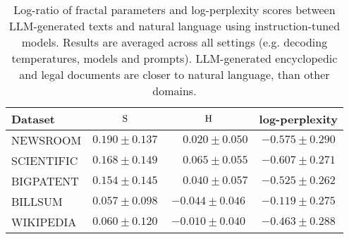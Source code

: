 \begin{table}[t]
    \centering\scriptsize
    \caption{Log-ratio of fractal parameters and log-perplexity scores between LLM-generated texts and natural language using instruction-tuned models. Results are averaged across all settings (e.g. decoding temperatures,  models and prompts). LLM-generated encyclopedic and legal documents are closer to natural language, than other domains.
    }
    \label{tab:domains}
\begin{tabularx}{\linewidth}{l|c|c|c}
  \toprule
  \bf Dataset& $\mathrm{S}$ & $\mathrm{H}$ &\bf log-perplexity \\ \midrule
  NEWSROOM &$0.190\pm0.137$ & $\phantom{+}0.020\pm0.050$& $-0.575\pm0.290$\\
  SCIENTIFIC &$0.168\pm0.149$ &$\phantom{+}0.065\pm0.055$ &$-0.607\pm0.271$ \\
  BIGPATENT &$0.154\pm0.145$ &$\phantom{+}0.040\pm0.057$ &$	-0.525\pm0.262$ \\
  BILLSUM &$0.057\pm0.098$ &$-0.044\pm0.046$ &$-0.119\pm0.275$ \\
  WIKIPEDIA &$0.060\pm0.120$ &$-0.010\pm0.040$ &$-0.463\pm0.288$ \\
  \bottomrule
  \end{tabularx}
\end{table}

